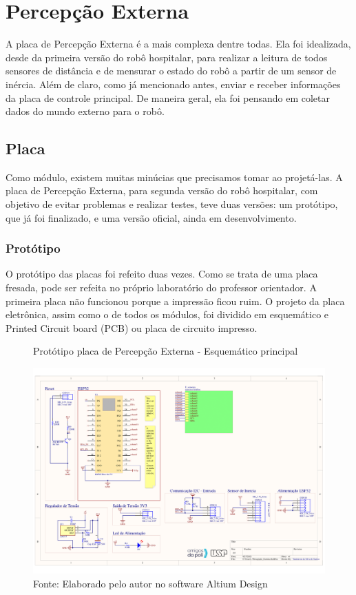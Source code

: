 \documentclass[../delivery_hospital_report.tex]{subfiles}
\begin{document}
\clearpage
\section{Percepção Externa}

A placa de Percepção Externa é a mais complexa dentre todas. Ela foi idealizada, desde da primeira versão do robô hospitalar, para realizar a leitura de todos sensores de distância e de mensurar o estado do robô a partir de um sensor de inércia. Além de claro, como já mencionado antes, enviar e receber informações da placa de controle principal. De maneira geral, ela foi pensando em coletar dados do mundo externo para o robô.

\subsection{Placa}

Como módulo, existem muitas minúcias que precisamos tomar ao projetá-las. A placa de Percepção Externa, para segunda versão do robô hospitalar, com objetivo de evitar problemas e realizar testes, teve duas versões: um protótipo, que já foi finalizado, e uma versão oficial, ainda em desenvolvimento. 

\subsubsection{Protótipo}

O protótipo das placas foi refeito duas vezes. Como se trata de uma placa fresada, pode ser refeita no próprio laboratório do professor orientador. A primeira placa não funcionou porque a impressão ficou ruim. O projeto da placa eletrônica, assim como o de todos os módulos, foi dividido em esquemático e Printed Circuit board (PCB)  ou placa de circuito impresso. 

\begin{figure}[!h]
\centering
    \caption{Protótipo placa de Percepção Externa - Esquemático principal }
    \centering %
    \includegraphics[width=17cm]{modulos/Percepção_Externa-1.png}
    \caption*{Fonte: Elaborado pelo autor no software Altium Design\cite{altium21} }
    \label{Protótipo placa de ## - Esquemático principal}
\end{figure}
\end{document}
